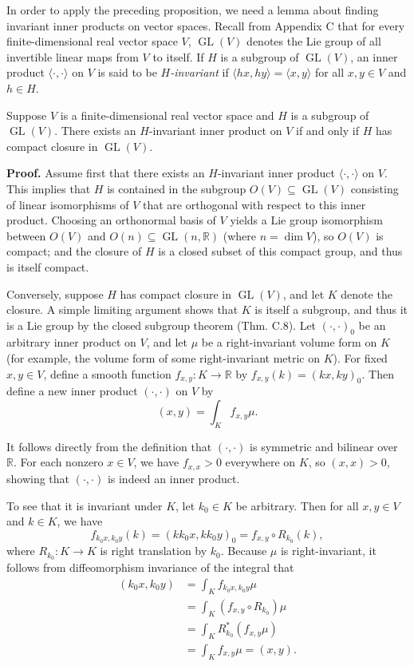 In order to apply the preceding proposition, we need a lemma about finding invariant inner products on vector spaces. Recall from Appendix C that for every finite-dimensional real vector space $V$, $\operatorname{GL}(V)$ denotes the Lie group of all invertible linear maps from $V$ to itself. If $H$ is a subgroup of $\operatorname{GL}(V)$, an inner product $\langle \cdot, \cdot \rangle$ on $V$ is said to be \textit{$H$-invariant} if $\langle hx, hy \rangle = \langle x, y \rangle$ for all $x, y \in V$ and $h \in H$.

\begin{lemma}
\label{lem:invariant-inner-product-compact}

Suppose $V$ is a finite-dimensional real vector space and $H$ is a subgroup of $\operatorname{GL}(V)$. There exists an $H$-invariant inner product on $V$ if and only if $H$ has compact closure in $\operatorname{GL}(V)$.

\textbf{Proof.} Assume first that there exists an $H$-invariant inner product $\langle \cdot, \cdot \rangle$ on $V$. This implies that $H$ is contained in the subgroup $O(V) \subseteq \operatorname{GL}(V)$ consisting of linear isomorphisms of $V$ that are orthogonal with respect to this inner product. Choosing an orthonormal basis of $V$ yields a Lie group isomorphism between $O(V)$ and $O(n) \subseteq \operatorname{GL}(n, \mathbb{R})$ (where $n = \dim V$), so $O(V)$ is compact; and the closure of $H$ is a closed subset of this compact group, and thus is itself compact.

Conversely, suppose $H$ has compact closure in $\operatorname{GL}(V)$, and let $K$ denote the closure. A simple limiting argument shows that $K$ is itself a subgroup, and thus it is a Lie group by the closed subgroup theorem (Thm. C.8). Let $(\cdot,\cdot)_0$ be an arbitrary inner product on $V$, and let $\mu$ be a right-invariant volume form on $K$ (for example, the volume form of some right-invariant metric on $K$). For fixed $x, y \in V$, define a smooth function $f_{x,y}: K \to \mathbb{R}$ by $f_{x,y}(k) = (kx, ky)_0$. Then define a new inner product $(\cdot, \cdot)$ on $V$ by
\[
  (x,y) = \int_K f_{x,y} \mu.
\]

It follows directly from the definition that $(\cdot, \cdot)$ is symmetric and bilinear over $\mathbb{R}$. For each nonzero $x \in V$, we have $f_{x,x} > 0$ everywhere on $K$, so $(x,x) > 0$, showing that $(\cdot, \cdot)$ is indeed an inner product.

To see that it is invariant under $K$, let $k_0 \in K$ be arbitrary. Then for all $x, y \in V$ and $k \in K$, we have
\[
  f_{k_0 x, k_0 y}(k) = (k k_0 x, k k_0 y)_0 = f_{x,y} \circ R_{k_0}(k),
\]
where $R_{k_0}: K \to K$ is right translation by $k_0$. Because $\mu$ is right-invariant, it follows from diffeomorphism invariance of the integral that
\begin{align*}
  (k_0 x, k_0 y) &= \int_K f_{k_0 x, k_0 y} \mu \\
                 &= \int_K (f_{x,y} \circ R_{k_0}) \mu \\
                 &= \int_K R_{k_0}^* (f_{x,y} \mu) \\
                 &= \int_K f_{x,y} \mu = (x,y).
\end{align*}


\end{lemma}
